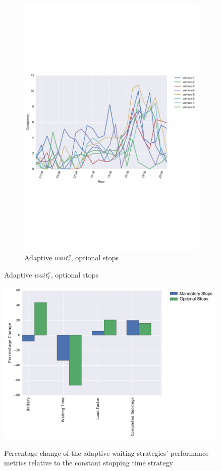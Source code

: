 \documentclass[12pt,a4paper]{article}
\begin{document}
\begin{figure}
{\begin{subfigure}[b]{0.49\textwidth}
  \includegraphics[width=\linewidth]{./images/optionalstops}
  \caption{Adaptive $wait_t^{v}$, optional stops}
  \label{skipload}
\end{subfigure}
}
\label{simuload}
\end{figure}

\begin{figure}
  \centering
  \caption{Percentage change of the adaptive waiting strategies' performance metrics relative to the constant stopping time strategy}
\includegraphics[scale=0.5]{./images/headwayCompare.pdf}
\label{hwcompare}
\end{figure}
\end{document}
